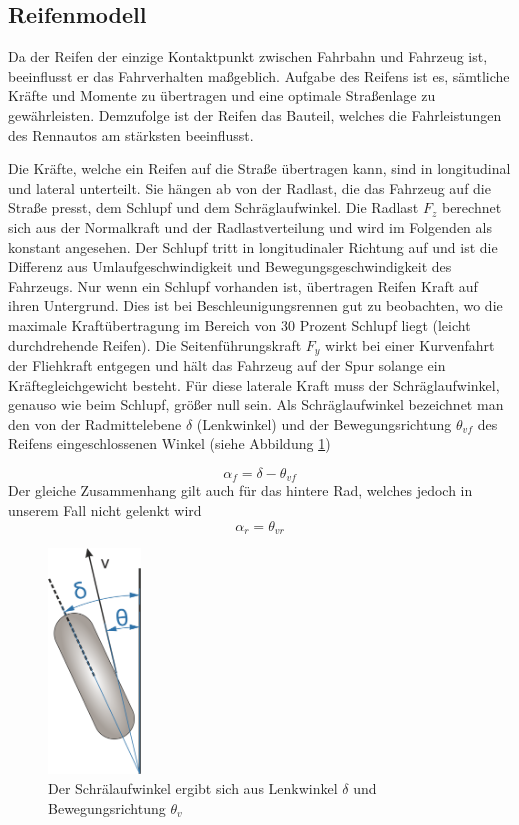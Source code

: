 \documentclass{like}
\begin{document}
\subsection{Reifenmodell}
\label{tireModel}
Da der Reifen der einzige Kontaktpunkt zwischen Fahrbahn und Fahrzeug ist, beeinflusst er das Fahrverhalten maßgeblich. Aufgabe des Reifens ist es, sämtliche Kräfte und Momente zu übertragen und eine optimale Straßenlage zu gewährleisten. Demzufolge ist der Reifen das Bauteil, welches die Fahrleistungen des Rennautos am stärksten beeinflusst.

Die Kräfte, welche ein Reifen auf die Straße übertragen kann, sind in longitudinal und lateral unterteilt. Sie hängen ab von der Radlast, die das Fahrzeug auf die Straße presst, dem Schlupf und dem Schräglaufwinkel. Die Radlast \(F_z\) berechnet sich aus der Normalkraft und der Radlastverteilung und wird im Folgenden als konstant angesehen. Der Schlupf tritt in longitudinaler Richtung auf und ist die Differenz aus Umlaufgeschwindigkeit und Bewegungsgeschwindigkeit des Fahrzeugs.
Nur wenn ein Schlupf vorhanden ist, übertragen Reifen Kraft auf ihren Untergrund. Dies ist bei Beschleunigungsrennen gut zu beobachten, wo die maximale Kraftübertragung im Bereich von 30 Prozent Schlupf liegt (leicht durchdrehende Reifen).
Die Seitenführungskraft \(F_y\) wirkt bei einer Kurvenfahrt der Fliehkraft entgegen und hält das Fahrzeug auf der Spur solange ein Kräftegleichgewicht besteht. Für diese laterale Kraft muss der Schräglaufwinkel, genauso wie beim Schlupf, größer null sein. Als Schräglaufwinkel bezeichnet man den von der Radmittelebene \(\delta\) (Lenkwinkel) und der Bewegungsrichtung \(\theta_{vf}\) des Reifens eingeschlossenen Winkel (siehe Abbildung \ref{fig:linLat})

\begin{equation}
\alpha_f = \delta - \theta_{vf}
\end{equation}
Der gleiche Zusammenhang gilt auch für das hintere Rad, welches jedoch in unserem Fall nicht gelenkt wird
\begin{equation}
\alpha_r = \theta_{vr}
\end{equation}


\begin{figure}[ht!]
	\centering
	\includegraphics[width=70pt]{Abbildungen/slipAngle.png}
	\caption{Der Schrälaufwinkel ergibt sich aus Lenkwinkel \(\delta\) und Bewegungsrichtung \(\theta_{v}\)}
	\label{fig:linLat}
\end{figure}
\end{document}
